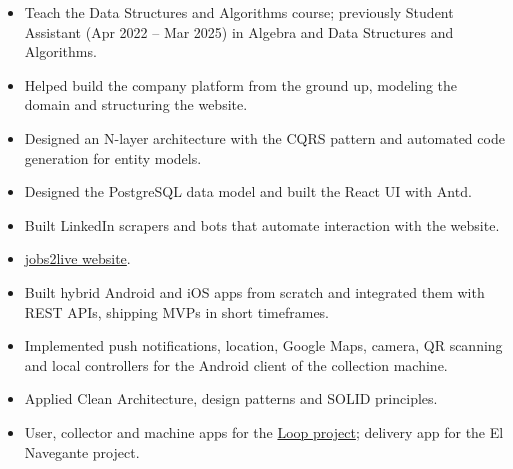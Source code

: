 \documentclass[9pt,a4paper]{altacv}
\begin{document}
\divider

\begin{itemize}
	\item Teach the Data Structures and Algorithms course; previously Student Assistant (Apr 2022 -- Mar 2025) in Algebra and Data Structures and Algorithms.
\end{itemize}

\divider

\begin{itemize}
	\item Helped build the company platform from the ground up, modeling the domain and structuring the website.
	\item Designed an N-layer architecture with the CQRS pattern and automated code generation for entity models.
	\item Designed the PostgreSQL data model and built the React UI with Antd.
	\item Built LinkedIn scrapers and bots that automate interaction with the website.
	\item \href{https://www.jobs2live.com/website}{jobs2live website}.
\end{itemize}

\divider

\begin{itemize}
	\item Built hybrid Android and iOS apps from scratch and integrated them with REST APIs, shipping MVPs in short timeframes.
	\item Implemented push notifications, location, Google Maps, camera, QR scanning and local controllers for the Android client of the collection machine.
	\item Applied Clean Architecture, design patterns and SOLID principles.
	\item User, collector and machine apps for the \href{https://land.mideyneutraliza.com/}{Loop project}; delivery app for the El Navegante project.
\end{itemize}


\end{document}
